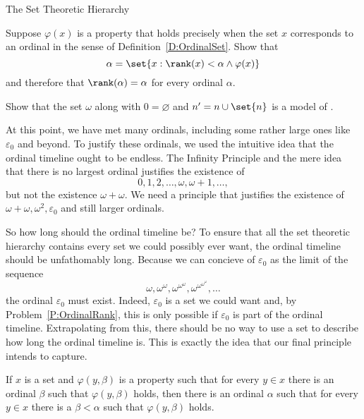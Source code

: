 \begin{unit}{The Set Theoretic Hierarchy}
\begin{problem}\label{P:OrdinalRank}
  Suppose \(\varphi(x)\) is a property that holds precisely when the set \(x\) corresponds to an ordinal in the sense of Definition~\ref{D:OrdinalSet}.
  Show that \[\alpha = \set{x : \rank(x) < \alpha \land \varphi(x)}\] and therefore that \(\rank(\alpha) = \alpha\) for every ordinal \(\alpha.\)
\end{problem}

\begin{problem}\label{P:OrdPA}
  Show that the set \(\omega\) along with \(0 = \varnothing\) and \(n' = n\cup\set{n}\) is a model of \PA.
\end{problem}

At this point, we have met many ordinals, including some rather large ones like \(\varepsilon_0\) and beyond. 
To justify these ordinals, we used the intuitive idea that the ordinal timeline ought to be endless.
The Infinity Principle and the mere idea that there is no largest ordinal justifies the existence of \[0,1,2,\ldots,\omega,\omega+1,\ldots,\] but not the existence \(\omega+\omega.\)
We need a principle that justifies the existence of \(\omega+\omega,\omega^2,\varepsilon_0\) and still larger ordinals.

So how long should the ordinal timeline be?
To ensure that all the set theoretic hierarchy contains every set we could possibly ever want, the ordinal timeline should be unfathomably long.
Because we can concieve of \(\varepsilon_0\) as the limit of the sequence \[\omega,\omega^\omega,\omega^{\omega^\omega},\omega^{\omega^{\omega^\omega}},\ldots\]
the ordinal \(\varepsilon_0\) must exist.
Indeed, \(\varepsilon_0\) is a set we could want and, by Problem~\ref{P:OrdinalRank}, this is only possible if \(\varepsilon_0\) is part of the ordinal timeline.
Extrapolating from this, there should be no way to use a set to describe how long the ordinal timeline is.
This is exactly the idea that our final principle intends to capture.

\begin{inaccessibility}
  If \(x\) is a set and \(\varphi(y,\beta)\) is a property such that for every \(y \in x\) there is an ordinal \(\beta\) such that \(\varphi(y,\beta)\) holds, then there is an ordinal \(\alpha\) such that for every \(y \in x\) there is a \(\beta < \alpha\) such that \(\varphi(y,\beta)\) holds.
\end{inaccessibility}


\end{unit}
